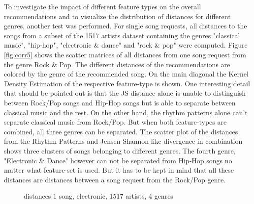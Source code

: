 \noindent To investigate the impact of different feature types on the overall recommendations and to visualize the distribution of distances for different genres, another test was performed. For single song requests, all distances to the songs from a subset of the 1517 artists dataset containing the genres "classical music", "hip-hop", "electronic \& dance" and "rock \& pop" were computed. Figure \ref{fig:corr5} shows the scatter matrices of all distances from one song request from the genre Rock \& Pop. The different distances of the recommendations are colored by the genre of the recommended song. 
\noindent On the main diagonal the Kernel Density Estimation of the respective feature-type is shown. One interesting detail that should be pointed out is that the JS distance alone is unable to distinguish between Rock/Pop songs and Hip-Hop songs but is able to separate between classical music and the rest. On the other hand, the rhythm patterns alone can't separate classical music from Rock/Pop. But when both feature-types are combined, all three genres can be separated. The scatter plot of the distances from the Rhythm Patterns and Jensen-Shannon-like divergence in combination shows three clusters of songs belonging to different genres. The fourth genre, "Electronic \& Dance" however can not be separated from Hip-Hop songs no matter what feature-set is used. But it has to be kept in mind that all these distances are distances between a song request from the Rock/Pop genre. 

\begin{figure}[htbp]
	\centering
	\caption{distances 1 song, electronic, 1517 artists, 4 genres}
	\label{fig:corr6}
\end{figure}
\FloatBarrier

